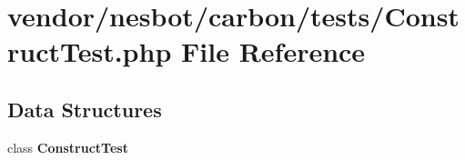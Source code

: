 \section{vendor/nesbot/carbon/tests/\+Construct\+Test.php File Reference}
\label{_construct_test_8php}
\subsection*{Data Structures}
\begin{DoxyCompactItemize}
\item 
class {\bf Construct\+Test}
\end{DoxyCompactItemize}
